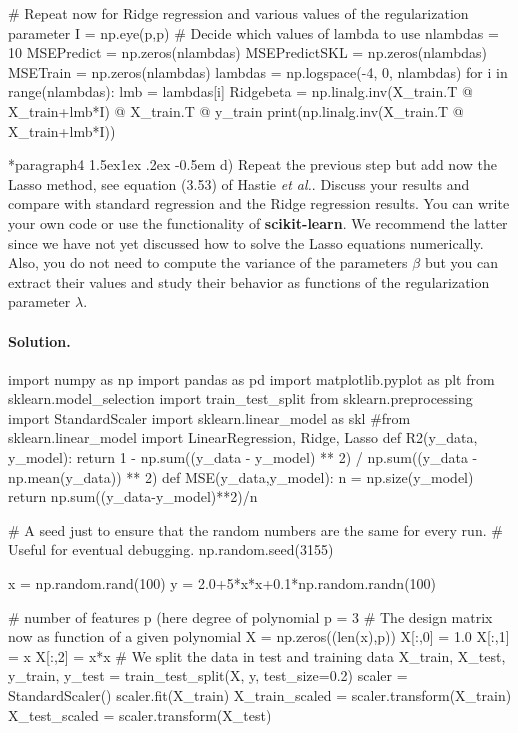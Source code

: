 \documentclass[%
oneside,                 %
final,                   %
10pt]{article}
\makeatletter
\newenvironment{doconceexercise}{}{}
\newcommand\subex{\@startsection*{paragraph}{4}{\z@}%
                  {1.5ex\@plus1ex \@minus.2ex}%
                  {-0.5em}%
                  {\normalfont\normalsize\bfseries}}
\makeatother
\begin{document}
\begin{doconceexercise}
\begin{print}
# Repeat now for Ridge regression and various values of the regularization parameter
I = np.eye(p,p)
# Decide which values of lambda to use
nlambdas = 10
MSEPredict = np.zeros(nlambdas)
MSEPredictSKL = np.zeros(nlambdas)
MSETrain = np.zeros(nlambdas)
lambdas = np.logspace(-4, 0, nlambdas)
for i in range(nlambdas):
    lmb = lambdas[i]
    Ridgebeta = np.linalg.inv(X_train.T @ X_train+lmb*I) @ X_train.T @ y_train
    print(np.linalg.inv(X_train.T @ X_train+lmb*I))



\end{print}


\subex{d)}
Repeat the previous step but add now the Lasso method, see equation (3.53) of Hastie \emph{et al.}. Discuss your results and compare with standard regression and the Ridge regression results. You can write your own code or use the functionality of \textbf{scikit-learn}.  We recommend the latter since we have not yet discussed how to solve the Lasso equations numerically. Also, you do not need to compute the variance of the parameters $\beta$ but you can extract their values and study their behavior as functions of the regularization parameter $\lambda$.


\paragraph{Solution.}
\begin{print}
import numpy as np
import pandas as pd
import matplotlib.pyplot as plt
from sklearn.model_selection import train_test_split
from sklearn.preprocessing import StandardScaler
import sklearn.linear_model as skl
#from sklearn.linear_model import LinearRegression, Ridge, Lasso
def R2(y_data, y_model):
    return 1 - np.sum((y_data - y_model) ** 2) / np.sum((y_data - np.mean(y_data)) ** 2)
def MSE(y_data,y_model):
    n = np.size(y_model)
    return np.sum((y_data-y_model)**2)/n


# A seed just to ensure that the random numbers are the same for every run.
# Useful for eventual debugging.
np.random.seed(3155)

x = np.random.rand(100)
y = 2.0+5*x*x+0.1*np.random.randn(100)

# number of features p (here degree of polynomial
p = 3
#  The design matrix now as function of a given polynomial
X = np.zeros((len(x),p))
X[:,0] = 1.0
X[:,1] = x
X[:,2] = x*x
# We split the data in test and training data
X_train, X_test, y_train, y_test = train_test_split(X, y, test_size=0.2)
scaler = StandardScaler()
scaler.fit(X_train)
X_train_scaled = scaler.transform(X_train)
X_test_scaled = scaler.transform(X_test)


\end{print}
\end{doconceexercise}
\end{document}
